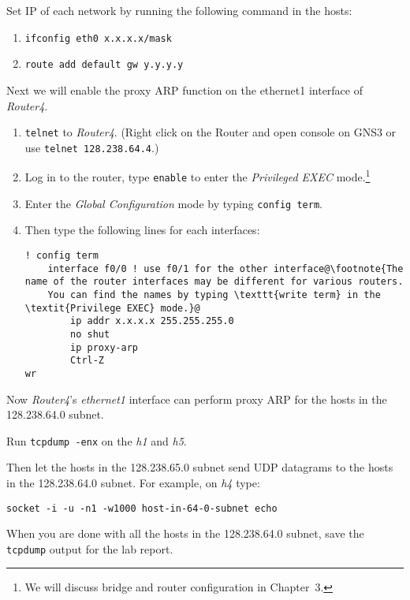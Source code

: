 \documentclass{../UTNetLab}
\begin{document}
    Set IP of each network by running the following command in the hosts:
    \begin{enumerate}
        \item \lstinline[emph={x}]{ifconfig eth0 x.x.x.x/mask}
        \item \lstinline[emph={y}]{route add default gw y.y.y.y}
    \end{enumerate}
    Next we will enable the proxy ARP function on the ethernet1 interface of \textit{Router4}.
    \begin{enumerate}
        \item \lstinline{telnet} to \textit{Router4}.
                (Right click on the Router and open console on GNS3 or use \lstinline{telnet 128.238.64.4}.)
        \item Log in to the router, type \lstinline[language={cisco}]{enable} to enter the \textit{Privileged EXEC} mode.\footnote{We will discuss bridge and router configuration in Chapter~3.}
        \item Enter the \textit{Global Configuration} mode by typing \lstinline[language={cisco}]{config term}.
        \item Then type the following lines for each interfaces:
        \begin{lstlisting}[language={cisco}, escapechar={@}, emph={x}]
! config term
    interface f0/0 ! use f0/1 for the other interface@\footnote{The name of the router interfaces may be different for various routers.
    You can find the names by typing \texttt{write term} in the \textit{Privilege EXEC} mode.}@
        ip addr x.x.x.x 255.255.255.0
        no shut
        ip proxy-arp
        Ctrl-Z
wr
        \end{lstlisting}
    \end{enumerate}
    
    Now \textit{Router4}’s \textit{ethernet1} interface can perform proxy ARP for the hosts in the 128.238.64.0 subnet.

    Run \lstinline{tcpdump -enx} on the \textit{h1} and \textit{h5}.

    Then let the hosts in the 128.238.65.0 subnet send UDP datagrams to the hosts in the 128.238.64.0 subnet.
    For example, on \textit{h4} type:
    \begin{lstlisting}[emph={host-in-64-0-subnet}]
socket -i -u -n1 -w1000 host-in-64-0-subnet echo
    \end{lstlisting}

    When you are done with all the hosts in the 128.238.64.0 subnet, save the \lstinline{tcpdump} output for the lab report.
\end{document}

